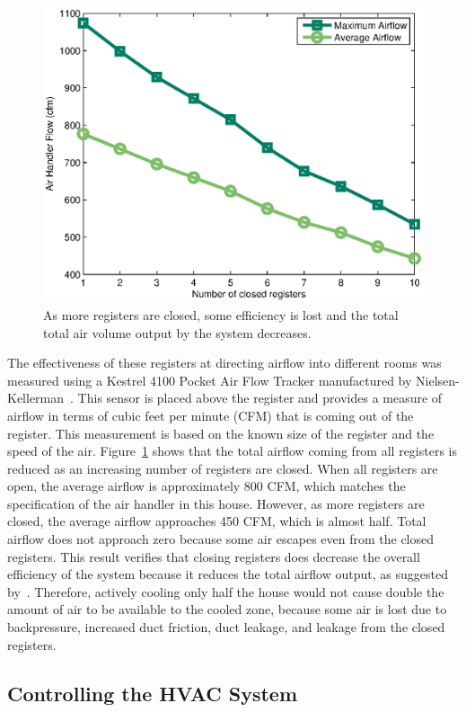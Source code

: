 \begin{figure}[!htb]
  \centering
  \includegraphics[width=0.6\columnwidth]{fig/regClosingAirflow.eps}
  \caption[Effect of Closing Registers on Air Flow]{As more registers are
    closed, some efficiency is lost and the total total air volume output by the
    system decreases.}
  \label{fig:regClosingAirflow}
\end{figure}

The effectiveness of these registers at directing airflow into different rooms
was measured using a Kestrel 4100 Pocket Air Flow Tracker manufactured by
Nielsen-Kellerman~\cite{kestrel}. This sensor is placed above the register and
provides a measure of airflow in terms of cubic feet per minute (CFM) that is
coming out of the register.  This measurement is based on the known size of the
register and the speed of the air.  Figure~\ref{fig:regClosingAirflow} shows
that the total airflow coming from all registers is reduced as an increasing
number of registers are closed.  When all registers are open, the average
airflow is approximately 800 CFM, which matches the specification of the air
handler in this house.  However, as more registers are closed, the average
airflow approaches 450 CFM, which is almost half. Total airflow does not
approach zero because some air escapes even from the closed registers.  This
result verifies that closing registers does decrease the overall efficiency of
the system because it reduces the total airflow output, as suggested
by~\cite{walker2003register}.  Therefore, actively cooling only half the house
would not cause double the amount of air to be available to the cooled zone,
because some air is lost due to backpressure, increased duct friction, duct
leakage, and leakage from the closed registers.

\subsection{Controlling the HVAC System}
\label{subsec:controllingHVAC}

